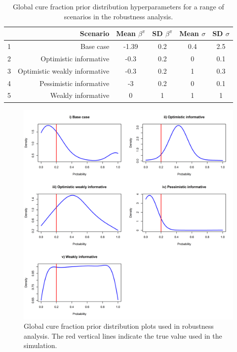 \documentclass[AMA,STIX1COL]{WileyNJD-v2}
\begin{document}
\begin{table}[h!]
\centering
\begin{tabular}{rrcccc}
\hline
& \textbf{Scenario} & \textbf{Mean $\beta^{\pi}$} & \textbf{SD $\beta^{\pi}$} & \textbf{Mean $\sigma$} & \textbf{SD $\sigma$} \\
\hline
1 & Base case & -1.39 & 0.2 & 0.4 & 2.5 \\
2 & Optimistic informative & -0.3 & 0.2 & 0 & 0.1 \\
3 & Optimistic weakly informative & -0.3 & 0.2 & 1 & 0.3 \\
4 & Pessimistic informative & -3 & 0.2 & 0 & 0.1 \\
5 & Weakly informative & 0 & 1 & 1 & 1 \\
\hline
\end{tabular}
\caption{Global cure fraction prior distribution hyperparameters for a range of scenarios in the robustness analysis.}
\label{tab:prior_robustness_params}
\end{table}

\begin{figure}[!ht]
\centering
\includegraphics[width=0.6\linewidth]{cure_fraction_prior_densities.png}
\caption{\label{fig:cf_prior_densities} Global cure fraction prior distribution plots used in robustness analysis. The red vertical lines indicate the true value used in the simulation.}
\end{figure}
\end{document}

